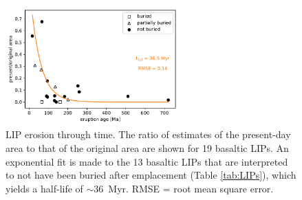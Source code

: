 \documentclass[11pt,letterpaper]{article}
\begin{document}
\begin{figure}[h!]
\begin{center}
	\includegraphics[width=0.6\textwidth]{Manuscript/Figures/LIP_Preservation.pdf}
	\caption{LIP erosion through time. The ratio of estimates of the present-day area to that of the original area are shown for 19 basaltic LIPs. An exponential fit is made to the 13 basaltic LIPs that are interpreted to not have been buried after emplacement (Table \ref{tab:LIPs}), which yields a half-life of $\sim$36~Myr. RMSE = root mean square error.}
	\label{fig:LIP_preservation}
\end{center}
\end{figure}
\end{document}

